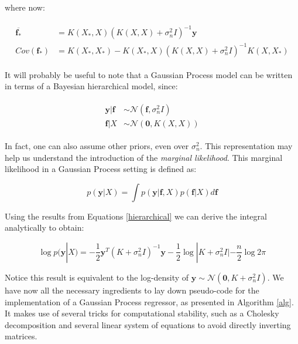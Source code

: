 \documentclass[10pt,a4paper,twoside]{book}
\begin{document}
where now:

\begin{align}
\begin{split}
\boldsymbol{\overline{f_*}} &= K(X_*, X)\left(K(X, X) + \sigma^2_n I   \right)^{-1}\boldsymbol{y}\\
Cov(\boldsymbol{f_*}) &= K(X_*, X_*) - K(X_*, X)\left(K(X, X) + \sigma_n^2 I \right)^{-1}K(X, X_*)
\end{split}
\end{align}

It will probably be useful to note that a Gaussian Process model can be written in terms of a Bayesian hierarchical model, since:

\begin{align}
\begin{split}
\label{hierarchical}
\boldsymbol{y}|\boldsymbol{f} &\sim \mathcal{N}(\boldsymbol{f}, \sigma^2_n I)\\
\boldsymbol{f}|X &\sim \mathcal{N}(\boldsymbol{0}, K(X, X))
\end{split}
\end{align}

In fact, one can also assume other priors, even over $\sigma_n^2$. This representation may help us understand the introduction of the \textit{marginal likelihood}. This marginal likelihood in a Gaussian Process setting is defined as:

\begin{equation}\label{marglike}
p(\boldsymbol{y}|X) = \int p(\boldsymbol{y}|\boldsymbol{f}, X)p(\boldsymbol{f}|X) d\boldsymbol{f}
\end{equation}

Using the results from Equations \ref{hierarchical} we can derive the integral analytically to obtain:

\begin{equation}
\log p(\boldsymbol{y}|X) = - \dfrac{1}{2}\boldsymbol{y}^T(K + \sigma^2_n I)^{-1}\boldsymbol{y} - \dfrac{1}{2}\log |K + \sigma^2_n I| - \dfrac{n}{2}\log 2\pi
\end{equation}

Notice this result is equivalent to the log-density of $\boldsymbol{y} \sim \mathcal{N}(\boldsymbol{0}, K + \sigma_n^2 I)$. We have now all the necessary ingredients to lay down pseudo-code for the implementation of a Gaussian Process regressor, as presented in Algorithm \ref{alg}. It makes use of several tricks for computational stability, such as a Cholesky decomposition and several linear system of equations to avoid directly inverting matrices.\\
\end{document}

